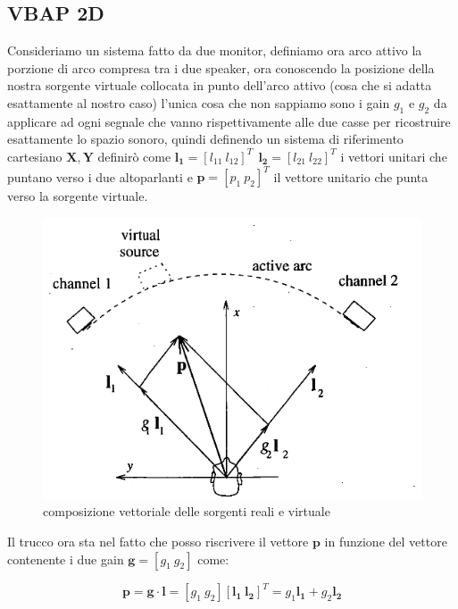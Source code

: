 \documentclass[12pt,a4paper]{report}
\begin{document}
\subsection{VBAP 2D}\label{c}
Consideriamo un sistema fatto da due monitor, definiamo ora arco attivo la porzione di arco compresa tra i due speaker, ora conoscendo la posizione della nostra sorgente virtuale collocata in punto dell'arco attivo (cosa che si adatta esattamente al nostro caso) l'unica cosa che non sappiamo sono i gain $g_1$ e $g_2$ da applicare ad ogni segnale che vanno rispettivamente alle due casse per ricostruire esattamente lo spazio sonoro, quindi definendo un sistema di riferimento cartesiano $ \boldsymbol{X},\boldsymbol{Y}$ definirò come $ \boldsymbol{l_{1}}= {\left[ l_{11} \ l_{12} \right]}^T \ \  \boldsymbol{l_{2}}= {\left[ l_{21} \ l_{22} \right]}^T$ i vettori unitari che puntano verso i due altoparlanti e $\boldsymbol{p}= {\left[ p_1 \ p_2 \right]}^T$ il vettore unitario che punta verso la sorgente virtuale.\\ 

\begin{figure}[htbp]
	\centering
	\includegraphics[scale=0.40]{figures/matrix2d.png}
	\caption {composizione vettoriale delle sorgenti reali e virtuale} 
	\label{fig:vettori2d}
	\end{figure}

Il trucco ora sta nel fatto che posso riscrivere il vettore $\boldsymbol{p}$ in funzione del vettore contenente i due gain $\boldsymbol{g}= \left[ g_1 \ g_2 \right]$ come:

\begin{equation}
\boldsymbol{p}= \boldsymbol{g} \cdot \boldsymbol{l} = \left[g_1 \ g_2 \right] \left[\boldsymbol{l_{1}} \ \boldsymbol{l_{2}} \right]^T = g_1 \boldsymbol{l_{1}} + g_2 \boldsymbol{l_{2}}
\label{eq:bbbb}
\end{equation}
\end{document}
